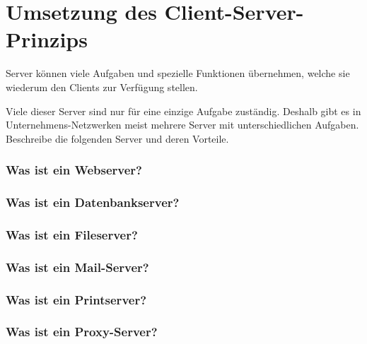 \chapter{Umsetzung des Client-Server-Prinzips}
\label{kap:clientserver}

\begin{aufgabe}[Servertypen]
Server können viele Aufgaben und spezielle Funktionen übernehmen, welche sie wiederum den Clients zur Verfügung stellen.

Viele dieser Server sind nur für eine einzige Aufgabe zuständig. Deshalb gibt es in Unternehmens-Netzwerken meist mehrere Server mit unterschiedlichen Aufgaben. Beschreibe die folgenden Server und deren Vorteile.
\end{aufgabe}

\subsection{Was ist ein Webserver?}

\subsection{Was ist ein Datenbankserver?}

\subsection{Was ist ein Fileserver?}

\subsection{Was ist ein Mail-Server?}

\subsection{Was ist ein Printserver?}

\subsection{Was ist ein Proxy-Server?}
